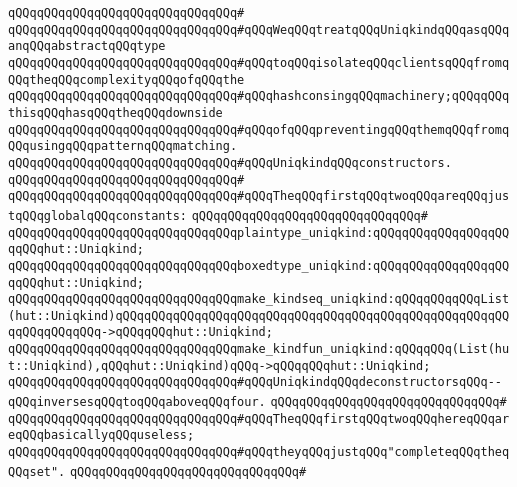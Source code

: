 \verb|qQQqqQQqqQQqqQQqqQQqqQQqqQQqqQQq#|\newline
\verb|qQQqqQQqqQQqqQQqqQQqqQQqqQQqqQQq#qQQqWeqQQqtreatqQQqUniqkindqQQqasqQQqanqQQqabstractqQQqtype|\newline
\verb|qQQqqQQqqQQqqQQqqQQqqQQqqQQqqQQq#qQQqtoqQQqisolateqQQqclientsqQQqfromqQQqtheqQQqcomplexityqQQqofqQQqthe|\newline
\verb|qQQqqQQqqQQqqQQqqQQqqQQqqQQqqQQq#qQQqhashconsingqQQqmachinery;qQQqqQQqthisqQQqhasqQQqtheqQQqdownside|\newline
\verb|qQQqqQQqqQQqqQQqqQQqqQQqqQQqqQQq#qQQqofqQQqpreventingqQQqthemqQQqfromqQQqusingqQQqpatternqQQqmatching.|\newline
\newline
\newline
\verb|qQQqqQQqqQQqqQQqqQQqqQQqqQQqqQQq#qQQqUniqkindqQQqconstructors.|\newline
\verb|qQQqqQQqqQQqqQQqqQQqqQQqqQQqqQQq#|\newline
\verb|qQQqqQQqqQQqqQQqqQQqqQQqqQQqqQQq#qQQqTheqQQqfirstqQQqtwoqQQqareqQQqjustqQQqglobalqQQqconstants:|\newline
\verb|qQQqqQQqqQQqqQQqqQQqqQQqqQQqqQQq#|\newline
\verb|qQQqqQQqqQQqqQQqqQQqqQQqqQQqqQQqplaintype_uniqkind:qQQqqQQqqQQqqQQqqQQqqQQqhut::Uniqkind;|\newline
\verb|qQQqqQQqqQQqqQQqqQQqqQQqqQQqqQQqboxedtype_uniqkind:qQQqqQQqqQQqqQQqqQQqqQQqhut::Uniqkind;|\newline
\verb|qQQqqQQqqQQqqQQqqQQqqQQqqQQqqQQqmake_kindseq_uniqkind:qQQqqQQqqQQqList(hut::Uniqkind)qQQqqQQqqQQqqQQqqQQqqQQqqQQqqQQqqQQqqQQqqQQqqQQqqQQqqQQqqQQqqQQqqQQq->qQQqqQQqhut::Uniqkind;|\newline
\verb|qQQqqQQqqQQqqQQqqQQqqQQqqQQqqQQqmake_kindfun_uniqkind:qQQqqQQq(List(hut::Uniqkind),qQQqhut::Uniqkind)qQQq->qQQqqQQqhut::Uniqkind;|\newline
\newline
\verb|qQQqqQQqqQQqqQQqqQQqqQQqqQQqqQQq#qQQqUniqkindqQQqdeconstructorsqQQq--qQQqinversesqQQqtoqQQqaboveqQQqfour.|\newline
\verb|qQQqqQQqqQQqqQQqqQQqqQQqqQQqqQQq#|\newline
\verb|qQQqqQQqqQQqqQQqqQQqqQQqqQQqqQQq#qQQqTheqQQqfirstqQQqtwoqQQqhereqQQqareqQQqbasicallyqQQquseless;|\newline
\verb|qQQqqQQqqQQqqQQqqQQqqQQqqQQqqQQq#qQQqtheyqQQqjustqQQq"completeqQQqtheqQQqset".|\newline
\verb|qQQqqQQqqQQqqQQqqQQqqQQqqQQqqQQq#|\newline
